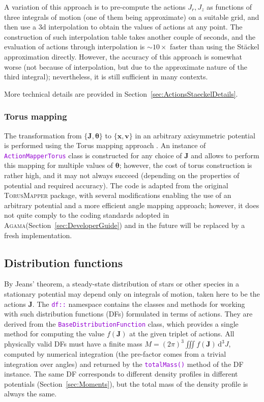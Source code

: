 \documentclass[12pt]{article}
\newcommand{\Agama}{\textsc{Agama}\xspace}
\newcommand{\ttt}[1]{\textcolor{darkviolet}{\texttt{#1}}}
\renewcommand{\d}{\mathrm{d}}
\newcommand{\bv}{\boldsymbol{v}}
\newcommand{\bx}{\boldsymbol{x}}
\newcommand{\bJ}{\boldsymbol{J}}
\newcommand{\bt}{\boldsymbol{\theta}}
\begin{document}
A variation of this approach is to pre-compute the actions $J_r,J_z$ as functions of three integrals of motion (one of them being approximate) on a suitable grid, and then use a 3d interpolation to obtain the values of actions at any point. The construction of such interpolation table takes another couple of seconds, and the evaluation of actions through interpolation is $\sim 10\times$ faster than using the St\"ackel approximation directly. However, the accuracy of this approach is somewhat worse (not because of interpolation, but due to the approximate nature of the third integral); nevertheless, it is still sufficient in many contexts.

More technical details are provided in Section~\ref{sec:ActionsStaeckelDetails}.


\subsubsection{Torus mapping}  \label{sec:ActionsTorus}

The transformation from $\{\bJ, \bt\}$ to $\{\bx,\bv\}$ in an arbitrary axisymmetric potential is performed using the Torus mapping approach \cite{BinneyMcMillan2016}. An instance of \ttt{ActionMapperTorus} class is constructed for any choice of $\bJ$ and allows to perform this mapping for multiple values of $\bt$; however, the cost of torus construction is rather high, and it may not always succeed (depending on the properties of potential and required accuracy). The code is adapted from the original \textsc{TorusMapper} package, with several modifications enabling the use of an arbitrary potential and a more efficient angle mapping approach; however, it does not quite comply to the coding standards adopted in \Agama (Section~\ref{sec:DeveloperGuide}) and in the future will be replaced by a fresh implementation. 


\subsection{Distribution functions}  \label{sec:DF}

By Jeans' theorem, a steady-state distribution of stars or other species in a stationary potential may depend only on integrals of motion, taken here to be the actions $\bJ$. The \ttt{df::} namespace contains the classes and methods for working with such distribution functions (DFs) formulated in terms of actions. They are derived from the \ttt{BaseDistributionFunction} class, which provides a single method for computing the value $f(\bJ)$ at the given triplet of actions. All physically valid DFs must have a finite mass $M = (2\pi)^3 \iiint f(\bJ)\,\d ^3J$, computed by numerical integration (the pre-factor comes from a trivial integration over angles) and returned by the \ttt{totalMass()} method of the DF instance.
The same DF corresponds to different density profiles in different potentials (Section~\ref{sec:Moments}), but the total mass of the density profile is always the same.
\end{document}
